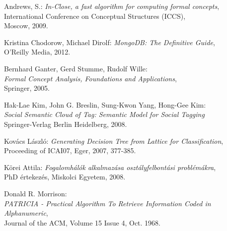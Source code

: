\begin{thebibliography}{9}



Andrews, S.: \emph{In-Close, a fast algorithm for computing formal concepts},\\
International Conference on Conceptual Structures (ICCS),\\
Moscow, 2009.

Kristina Chodorow, Michael Dirolf: \emph{MongoDB: The Definitive Guide}, \\
O'Reilly Media, 2012.

Bernhard Ganter, Gerd Stumme, Rudolf Wille:\\
\emph{Formal Concept Analysis, Foundations and Applications},\\
Springer, 2005.

Hak-Lae Kim, John G. Breslin, Sung-Kwon Yang, Hong-Gee Kim: \\
\emph{Social Semantic Cloud of Tag: Semantic Model for Social Tagging} \\
Springer-Verlag Berlin Heidelberg, 2008.

Kovács László: \emph{Generating Decision Tree from Lattice for Classification}, \\
Proceeding of ICAI07, Eger, 2007, 377-385.

Körei Attila: \textit{Fogalomhálók alkalmazása osztályfelbontási problémákra}, \\
PhD értekezés, Miskolci Egyetem, 2008.

Donald R. Morrison: \\
\textit{PATRICIA - Practical Algorithm To Retrieve Information Coded in Alphanumeric}, \\
Journal of the ACM, Volume 15 Issue 4, Oct. 1968.


\end{thebibliography}
